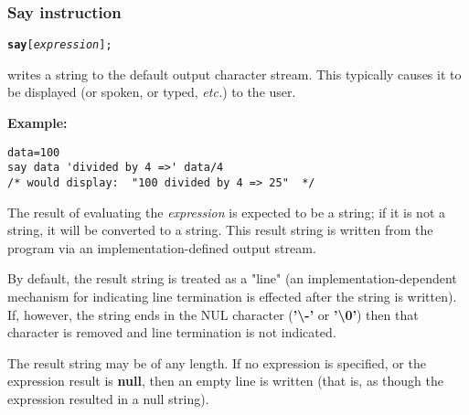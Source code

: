 \subsubsection{Say instruction}\label{refsay}
\index{,}
\index{,}
\begin{shaded}
\begin{alltt}
\textbf{say} [\emph{expression}];
\end{alltt}
\end{shaded}
  writes a string to the default output character
stream.
This typically causes it to be displayed (or spoken, or typed, \emph{etc.}) to
the user.

\textbf{Example:}
\begin{lstlisting}
data=100
say data 'divided by 4 =>' data/4
/* would display:  "100 divided by 4 => 25"  */
\end{lstlisting}
 
The result of evaluating the \emph{expression} is expected to be a
string; if it is not a string, it will be converted to a string.
This result string is written from the program via an
implementation-defined output stream.
 
\begin{shaded}\noindent
By default, the result string is treated as a "line" (an
implementation-dependent mechanism for indicating line termination is
effected after the string is written).
If, however, the string ends in the NUL character
(\textbf{'\textbackslash -'} or \textbf{'\textbackslash 0'}) then that character
is removed and line termination is not indicated.
\end{shaded}\indent
The result string may be of any length.  If no expression is specified,
or the expression result is \textbf{null}, then an empty line is
written (that is, as though the expression resulted in a null string).
